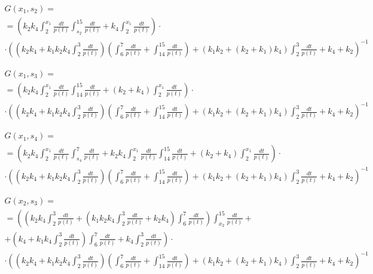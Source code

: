 \documentclass[a4paper,12pt]{article} %
\begin{document}
\begin{multline}
	G(x_1,s_2)=\\=
	\left(
		k_2 k_4 \int_{2}^{x_1}\frac{dt}{p(t)} \int_{s_2}^{15}\frac{dt}{p(t)}+k_4 \int_{2}^{x_1}\frac{dt}{p(t)}
	\right) \cdot \\ \cdot \left(
		\left( k_2 k_4+k_1 k_2 k_4 \int_{2}^{3}\frac{dt}{p(t)}\right)
		\left( \int_{6}^{7}\frac{dt}{p(t)}+ \int_{14}^{15}\frac{dt}{p(t)} \right)+
		\left( k_1 k_2+\left( k_2+k_1\right)  k_4\right)  \int_{2}^{3}\frac{dt}{p(t)}+k_4+k_2
	\right)^{-1}
\end{multline}

\begin{multline}
	G(x_1,s_3)=\\=
	\left(
		k_2 k_4 \int_{2}^{x_1}\frac{dt}{p(t)} \int_{14}^{15}\frac{dt}{p(t)}+\left( k_2+k_4\right)  \int_{2}^{x_1}\frac{dt}{p(t)}
	\right) \cdot \\ \cdot \left(
		\left( k_2 k_4+k_1 k_2 k_4 \int_{2}^{3}\frac{dt}{p(t)}\right)
		\left( \int_{6}^{7}\frac{dt}{p(t)}+ \int_{14}^{15}\frac{dt}{p(t)} \right)+
		\left( k_1 k_2+\left( k_2+k_1\right)  k_4\right)  \int_{2}^{3}\frac{dt}{p(t)}+k_4+k_2
	\right)^{-1}
\end{multline}

\begin{multline}
	G(x_1,s_4)=\\=
	\left(
		k_2 k_4 \int_{2}^{x_1}\frac{dt}{p(t)} \int_{s_4}^{7}\frac{dt}{p(t)}+k_2 k_4 \int_{2}^{x_1}\frac{dt}{p(t)} \int_{14}^{15}\frac{dt}{p(t)}+\left( k_2+k_4\right)  \int_{2}^{x_1}\frac{dt}{p(t)}
	\right) \cdot \\ \cdot \left(
		\left( k_2 k_4+k_1 k_2 k_4 \int_{2}^{3}\frac{dt}{p(t)}\right)
		\left( \int_{6}^{7}\frac{dt}{p(t)}+ \int_{14}^{15}\frac{dt}{p(t)} \right)+
		\left( k_1 k_2+\left( k_2+k_1\right)  k_4\right)  \int_{2}^{3}\frac{dt}{p(t)}+k_4+k_2
	\right)^{-1}
\end{multline}

\begin{multline}
	G(x_2,s_3)=\\=
	\left(
		\left( k_2 k_4 \int_{2}^{3}\frac{dt}{p(t)}+\left( k_1 k_2 k_4 \int_{2}^{3}\frac{dt}{p(t)}+
		k_2 k_4\right)  \int_{6}^{7}\frac{dt}{p(t)}\right)  \int_{x_2}^{15}\frac{dt}{p(t)}
		\right. + \\ + \left.
		\left( k_4+k_1 k_4 \int_{2}^{3}\frac{dt}{p(t)}\right)  \int_{6}^{7}\frac{dt}{p(t)}+k_4 \int_{2}^{3}\frac{dt}{p(t)}
	\right) \cdot \\ \cdot \left(
		\left( k_2 k_4+k_1 k_2 k_4 \int_{2}^{3}\frac{dt}{p(t)}\right)
		\left( \int_{6}^{7}\frac{dt}{p(t)}+ \int_{14}^{15}\frac{dt}{p(t)} \right)+
		\left( k_1 k_2+\left( k_2+k_1\right)  k_4\right)  \int_{2}^{3}\frac{dt}{p(t)}+k_4+k_2
	\right)^{-1}
\end{multline}
\end{document}
